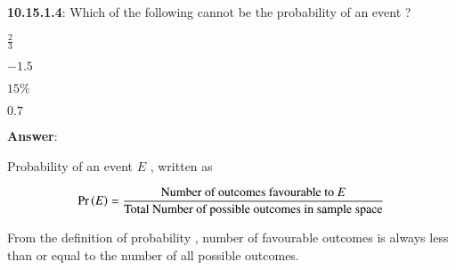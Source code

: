 \documentclass[journal,12pt,twocolumn]{IEEEtran}
\begin{document}
\noindent  \textbf{10.15.1.4}:
 Which of the following cannot be the probability of an event ?
\vspace{7pt}

\begin{enumerate*}
   
\item \hspace{4pt}\(\displaystyle\frac{2}{3}\) \hspace{5pt} 
\item \hspace{4pt}\(-1.5\) \hspace{5pt} 
\item \hspace{4pt}\(15\%\) \hspace{5pt}  
\item \hspace{4pt} \(0.7\) \hspace{5pt}     
\end{enumerate*}

\vspace{10pt}
\textbf{Answer}:

Probability of an event $E$ , written as \:

\begin{align}
\label{eq:def}
\Pr\left(E\right)=\displaystyle\frac{\text{Number of outcomes favourable to \(E\)}}{\text{Total Number of possible outcomes in sample space}}
\end{align}


From the definition of probability , number of favourable outcomes is always less than or equal to the number of all possible outcomes.
\end{document}
